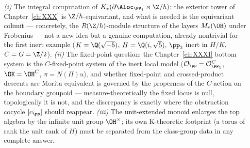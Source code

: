 \emph{(i)} The integral computation of
$K_*(\partial\Aloc_{\PP_1}\rtimes\Z/h)$: the exterior tower of Chapter~\ref{ch:XXX}
is $\Z/h$-equivariant, and what is needed is the equivariant colimit --- concretely, the
$R(\Z/h)$-module structure of the layers $M_r(\OH)$ under Frobenius --- not a new idea
but a genuine computation, already nontrivial for the first inert example
($K=\Q(\sqrt{-5})$, $H=\Q(i,\sqrt5)$, $\pp_3$ inert in $H/K$, $C=G=\Z/2$).
\emph{(ii)} The fixed-point question: the Chapter~\ref{ch:XXXI} bottom system is the $C$-fixed-point
system of the inert local model ($\mathcal O_\pp=\mathcal O_{\PP_1}^{C}$,
$\OK=\OH^{C}$, $\pi=N(\Pi)u$), and whether fixed-point and crossed-product descents are
Morita equivalent is governed by the properness of the $C$-action on the boundary
groupoid --- measure-theoretically the fixed locus is null, topologically it is not, and
the discrepancy is exactly where the obstruction cocycle $[c_\pp]$ should reappear.
\emph{(iii)} The unit-extended monoid enlarges the top algebra by the infinite unit group
$\OH^\times$; its own K-theoretic footprint (a torus of rank the unit rank of $H$) must
be separated from the class-group data in any complete answer.

